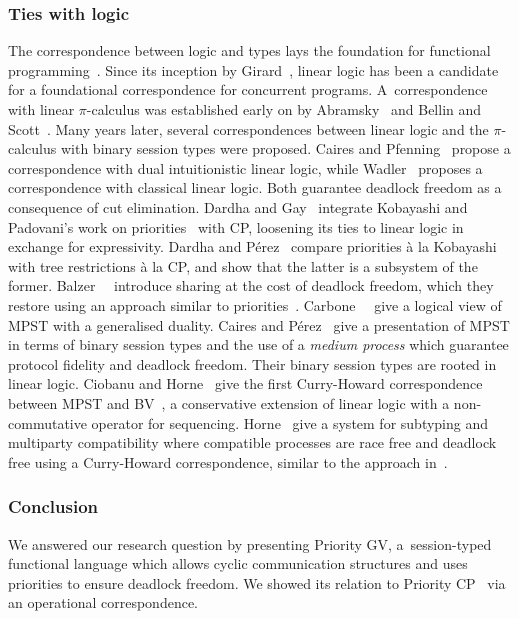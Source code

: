 \documentclass[main.tex]{subfiles}
\begin{document}
\subsubsection*{Ties with logic}
The correspondence between logic and types lays the foundation for functional programming~\cite{wadler15}.
Since its inception by Girard~\cite{girard87}, linear logic has been a candidate for a foundational correspondence for concurrent programs.
A~correspondence with linear $\pi$-calculus was established early on by Abramsky~\cite{abramsky94} and Bellin and Scott~\cite{bellinscott94}. Many years later, several correspondences between linear logic and the $\pi$-calculus with binary session types were proposed. Caires and Pfenning~\cite{cairespfenning10} propose a correspondence with dual intuitionistic linear logic, while Wadler~\cite{wadler14} proposes a correspondence with classical linear logic. Both guarantee deadlock freedom as a consequence of cut elimination.
Dardha and Gay~\cite{dardhagay18extended} integrate Kobayashi and Padovani's work on priorities~\cite{kobayashi06,padovani14} with CP, loosening its ties to linear logic in exchange for expressivity.
Dardha and P\'{e}rez~\cite{dardhaperez15extended} compare priorities \`a la Kobayashi with tree restrictions \`a la CP, and show that the latter is a subsystem of the former.
Balzer~\etal~\cite{balzerpfenning17} introduce sharing at the cost of deadlock freedom, which they restore using an approach similar to priorities~\cite{balzertoninho19}.
Carbone~\etal~\cite{CarboneMSY15,carbonelindley16} give a logical view of MPST with a generalised duality.
Caires and P\'{e}rez~\cite{CairesP16} give a presentation of MPST in terms of binary session types and the use of a \emph{medium process} which guarantee protocol fidelity and deadlock freedom. Their binary session types are rooted in linear logic.
Ciobanu and Horne~\cite{CiobanuH15} give the first Curry-Howard correspondence between MPST and BV~\cite{Guglielmi07}, a conservative extension of linear logic with a non-commutative operator for sequencing.
Horne~\cite{Horne20} give a system for subtyping and multiparty compatibility where compatible processes are race free and deadlock free using a Curry-Howard correspondence, similar to the approach in~\cite{CiobanuH15}.

\subsubsection*{Conclusion}
We answered our research question by presenting Priority GV, a~session-typed functional language which allows cyclic communication structures and uses priorities to ensure deadlock freedom. We showed its relation to Priority CP~\cite{dardhagay18extended} via an operational correspondence.
\end{document}
